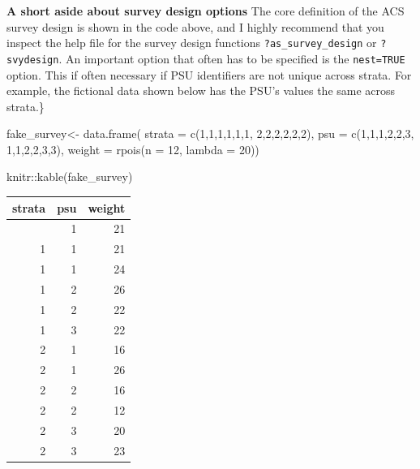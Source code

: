 \documentclass[
  letterpaper,
  DIV=11,
  numbers=noendperiod]{scrreprt}
\newenvironment{Shaded}{\begin{snugshade}}{\end{snugshade}}
\newcommand{\AttributeTok}[1]{\textcolor[rgb]{0.40,0.45,0.13}{#1}}
\newcommand{\DecValTok}[1]{\textcolor[rgb]{0.68,0.00,0.00}{#1}}
\newcommand{\FunctionTok}[1]{\textcolor[rgb]{0.28,0.35,0.67}{#1}}
\newcommand{\NormalTok}[1]{\textcolor[rgb]{0.00,0.23,0.31}{#1}}
\newcommand{\OtherTok}[1]{\textcolor[rgb]{0.00,0.23,0.31}{#1}}
\newcommand{\SpecialCharTok}[1]{\textcolor[rgb]{0.37,0.37,0.37}{#1}}
\begin{document}
\textbf{A short aside about survey design options} The core definition
of the ACS survey design is shown in the code above, and I highly
recommend that you inspect the help file for the survey design functions
\texttt{?as\_survey\_design} or \texttt{?svydesign}. An important option
that often has to be specified is the \texttt{nest=TRUE} option. This if
often necessary if PSU identifiers are not unique across strata. For
example, the fictional data shown below has the PSU's values the same
across strata.\}

\begin{Shaded}
\begin{Highlighting}[]
\NormalTok{fake\_survey}\OtherTok{\textless{}{-}} \FunctionTok{data.frame}\NormalTok{(}
  \AttributeTok{strata =} \FunctionTok{c}\NormalTok{(}\DecValTok{1}\NormalTok{,}\DecValTok{1}\NormalTok{,}\DecValTok{1}\NormalTok{,}\DecValTok{1}\NormalTok{,}\DecValTok{1}\NormalTok{,}\DecValTok{1}\NormalTok{,}
             \DecValTok{2}\NormalTok{,}\DecValTok{2}\NormalTok{,}\DecValTok{2}\NormalTok{,}\DecValTok{2}\NormalTok{,}\DecValTok{2}\NormalTok{,}\DecValTok{2}\NormalTok{),}
  \AttributeTok{psu =} \FunctionTok{c}\NormalTok{(}\DecValTok{1}\NormalTok{,}\DecValTok{1}\NormalTok{,}\DecValTok{1}\NormalTok{,}\DecValTok{2}\NormalTok{,}\DecValTok{2}\NormalTok{,}\DecValTok{3}\NormalTok{,}
          \DecValTok{1}\NormalTok{,}\DecValTok{1}\NormalTok{,}\DecValTok{2}\NormalTok{,}\DecValTok{2}\NormalTok{,}\DecValTok{3}\NormalTok{,}\DecValTok{3}\NormalTok{),}
  \AttributeTok{weight =} \FunctionTok{rpois}\NormalTok{(}\AttributeTok{n =} \DecValTok{12}\NormalTok{, }\AttributeTok{lambda =} \DecValTok{20}\NormalTok{))}

\NormalTok{knitr}\SpecialCharTok{::}\FunctionTok{kable}\NormalTok{(fake\_survey)}
\end{Highlighting}
\end{Shaded}

\begin{longtable}[]{@{}rrr@{}}
\toprule\noalign{}
strata & psu & weight \\
\midrule\noalign{}
\endhead
\bottomrule\noalign{}
\endlastfoot
1 & 1 & 21 \\
1 & 1 & 21 \\
1 & 1 & 24 \\
1 & 2 & 26 \\
1 & 2 & 22 \\
1 & 3 & 22 \\
2 & 1 & 16 \\
2 & 1 & 26 \\
2 & 2 & 16 \\
2 & 2 & 12 \\
2 & 3 & 20 \\
2 & 3 & 23 \\
\end{longtable}
\end{document}
